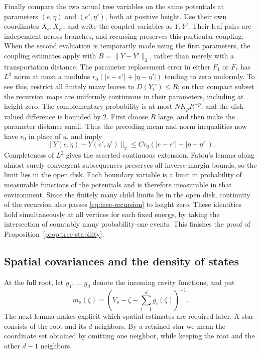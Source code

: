 Finally compare the two actual tree variables on the same potentials
at parameters $(e,\eta)$ and $(e',\eta')$, both at positive height.
Use their own coordinates $X_e,X_{e'}$, and write the coupled variables
as $Y,Y'$.  Their leaf pairs are independent across branches, and
recursing preserves this particular coupling.  When the second
evaluation is temporarily made using the first parameters, the
coupling estimates apply with $B=\|Y-Y'\|_2$, rather than merely
with a transportation distance.  The parameter replacement error in
either $F_1$ or $F_\ell$ has $L^2$ norm at most a modulus
$r_0(|e-e'|+|\eta-\eta'|)$ tending to zero uniformly.  To see this,
restrict all finitely many leaves to $D(Y_i')\le R$; on that compact
subset the recursion maps are uniformly continuous in their
parameters, including at height zero.  The complementary probability
is at most $NK_pR^{-p}$, and the disk-valued difference is bounded
by $2$.  First choose $R$ large, and then make the parameter distance
small.  Thus the preceding mean and norm inequalities now have
$r_0$ in place of $u$, and imply
\[
 \|Y(e,\eta)-Y(e',\eta')\|_2
 \le C r_0(|e-e'|+|\eta-\eta'|).
\]
Completeness of $L^2$ gives the asserted continuous extension.
Fatou's lemma along almost surely convergent subsequences preserves
all inverse-margin bounds, so the limit lies in the open disk.
Each boundary variable is a limit in probability of measurable
functions of the potentials and is therefore measurable in that
environment.  Since the finitely many child limits lie in the open
disk, continuity of the recursion also passes
\eqref{eq:tree-recursion} to height zero.  These identities hold
simultaneously at all vertices for each fixed energy, by taking the
intersection of countably many probability-one events.
This finishes the proof of
Proposition~\ref{prop:tree-stability}.

\subsection{Spatial covariances and the density of states}

At the full root, let $g_1,\ldots,g_d$ denote the incoming cavity
functions, and put
\[
 m_o(\zeta)=\left(V_o-\zeta-\sum_{i=1}^d g_i(\zeta)\right)^{-1}.
\]
The next lemma makes explicit which spatial estimates are required
later.  A star consists of the root and its $d$ neighbors.  By a
retained star we mean the coordinate set obtained by omitting one
neighbor, while keeping the root and the other $d-1$ neighbors.

